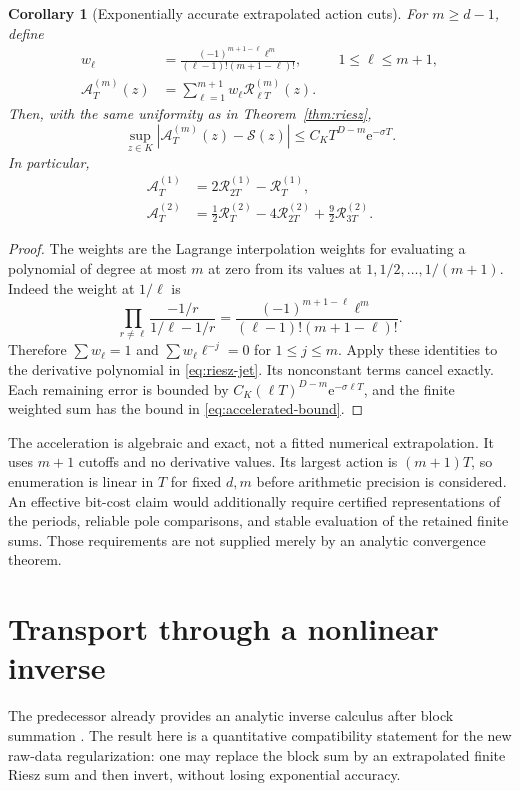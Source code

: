 \documentclass[11pt,a4paper]{article}
\numberwithin{equation}{section}
\newtheorem{corollary}[theorem]{Corollary}
\theoremstyle{definition}
\theoremstyle{remark}
\newcommand{\e}{\mathrm e}
\newcommand{\Ssum}{\mathcal S}
\newcommand{\Riesz}{\mathcal R}
\newcommand{\Accel}{\mathcal A}
\begin{document}
\begin{corollary}[Exponentially accurate extrapolated action cuts]
\label{cor:acceleration}
For $m\ge d-1$, define
\begin{align}
 w_\ell&=\frac{(-1)^{m+1-\ell}\ell^m}
                   {(\ell-1)!(m+1-\ell)!},
       &&1\le\ell\le m+1,\label{eq:weights}\\
 \Accel_T^{(m)}(z)&=\sum_{\ell=1}^{m+1}
                          w_\ell\Riesz_{\ell T}^{(m)}(z).
       \label{eq:acceleration}
\end{align}
Then, with the same uniformity as in Theorem~\ref{thm:riesz},
\begin{equation}
 \sup_{z\in K}|\Accel_T^{(m)}(z)-\Ssum(z)|
      \le C_KT^{D-m}\e^{-\sigma T}.
 \label{eq:accelerated-bound}
\end{equation}
In particular,
\begin{align}
 \Accel_T^{(1)}&=2\Riesz_{2T}^{(1)}-\Riesz_T^{(1)},\label{eq:accel-one}\\
 \Accel_T^{(2)}&=\tfrac12\Riesz_T^{(2)}-4\Riesz_{2T}^{(2)}
                         +\tfrac92\Riesz_{3T}^{(2)}.
 \label{eq:accel-two}
\end{align}
\end{corollary}
\begin{proof}
The weights are the Lagrange interpolation weights for evaluating a
polynomial of degree at most $m$ at zero from its values at
$1,1/2,\ldots,1/(m+1)$. Indeed the weight at $1/\ell$ is
\[
 \prod_{r\ne\ell}\frac{-1/r}{1/\ell-1/r}
 =\frac{(-1)^{m+1-\ell}\ell^m}{(\ell-1)!(m+1-\ell)!}.
\]
Therefore $\sum w_\ell=1$ and
$\sum w_\ell\ell^{-j}=0$ for $1\le j\le m$.
Apply these identities to the derivative polynomial in
\eqref{eq:riesz-jet}. Its nonconstant terms cancel exactly.
Each remaining error is bounded by
$C_K(\ell T)^{D-m}\e^{-\sigma\ell T}$, and the finite weighted sum
has the bound in \eqref{eq:accelerated-bound}.
\end{proof}

The acceleration is algebraic and exact, not a fitted numerical
extrapolation. It uses $m+1$ cutoffs and no derivative values. Its
largest action is $(m+1)T$, so enumeration is linear in $T$ for fixed
$d,m$ before arithmetic precision is considered. An effective bit-cost
claim would additionally require certified representations of the
periods, reliable pole comparisons, and stable evaluation of the
retained finite sums. Those requirements are not supplied merely by
an analytic convergence theorem.

\section{Transport through a nonlinear inverse}
\label{sec:inverse}
The predecessor already provides an analytic inverse calculus after
block summation \cite{repo-block}. The result here is a quantitative
compatibility statement for the new raw-data regularization: one may
replace the block sum by an extrapolated finite Riesz sum and then
invert, without losing exponential accuracy.
\end{document}
